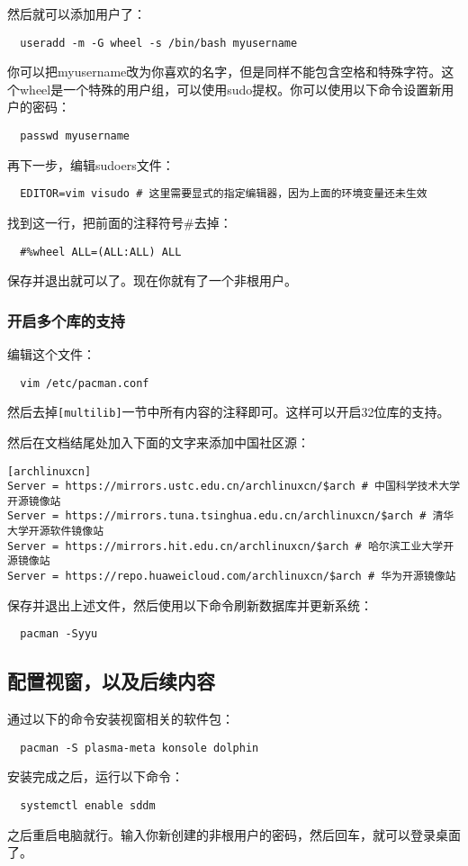 \documentclass[../main.tex]{subfiles}
\begin{document}
然后就可以添加用户了：
\begin{lstlisting}
  useradd -m -G wheel -s /bin/bash myusername
\end{lstlisting}
你可以把myusername改为你喜欢的名字，但是同样不能包含空格和特殊字符。这个wheel是一个特殊的用户组，可以使用sudo提权。你可以使用以下命令设置新用户的密码：
\begin{lstlisting}
  passwd myusername
\end{lstlisting}
再下一步，编辑sudoers文件：
\begin{lstlisting}
  EDITOR=vim visudo # 这里需要显式的指定编辑器，因为上面的环境变量还未生效
\end{lstlisting}
找到这一行，把前面的注释符号\#去掉：
\begin{lstlisting}
  #%wheel ALL=(ALL:ALL) ALL
\end{lstlisting}
保存并退出就可以了。现在你就有了一个非根用户。

\subsubsection{开启多个库的支持}

编辑这个文件：
\begin{lstlisting}
  vim /etc/pacman.conf
\end{lstlisting}
然后去掉\texttt{[multilib]}一节中所有内容的注释即可。这样可以开启32位库的支持。

然后在文档结尾处加入下面的文字来添加中国社区源：
\begin{lstlisting}
[archlinuxcn]
Server = https://mirrors.ustc.edu.cn/archlinuxcn/$arch # 中国科学技术大学开源镜像站
Server = https://mirrors.tuna.tsinghua.edu.cn/archlinuxcn/$arch # 清华大学开源软件镜像站
Server = https://mirrors.hit.edu.cn/archlinuxcn/$arch # 哈尔滨工业大学开源镜像站
Server = https://repo.huaweicloud.com/archlinuxcn/$arch # 华为开源镜像站
\end{lstlisting}

保存并退出上述文件，然后使用以下命令刷新数据库并更新系统：
\begin{lstlisting}
  pacman -Syyu
\end{lstlisting}

\subsection{配置视窗，以及后续内容}

通过以下的命令安装视窗相关的软件包：
\begin{lstlisting}
  pacman -S plasma-meta konsole dolphin
\end{lstlisting}
安装完成之后，运行以下命令：
\begin{lstlisting}
  systemctl enable sddm
\end{lstlisting}
之后重启电脑就行。输入你新创建的非根用户的密码，然后回车，就可以登录桌面了。
\end{document}
